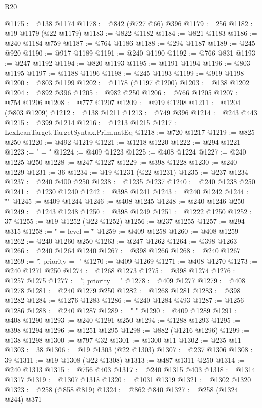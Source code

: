 \begin{lexlean}{R20}
\begin{coremodule}
@1175 := @138 @1174
@1178 := @842 (@727 @66) @396
@1179 := 256
@1182 := @19 @1179 (@22 @1179)
@1183 := @822 @1182
@1184 := @821 @1183
@1186 := @240 @1184 @759
@1187 := @764 @1186
@1188 := @294 @1187
@1189 := @245 @920
@1190 := @917 @1189
@1191 := @240 @1190
@1192 := @766 @831
@1193 := @247 @1192
@1194 := @820 @1193
@1195 := @1191 @1194
@1196 := @803 @1195
@1197 := @1188 @1196
@1198 := @245 @1193
@1199 := @919 @1198
@1200 := @803 @1199
@1202 := @1178 (@1197 @1200)
@1203 := @138 @1202
@1204 := @892 @396
@1205 := @982 @250
@1206 := @766 @1205
@1207 := @754 @1206
@1208 := @777 @1207
@1209 := @919 @1208
@1211 := @1204 (@803 @1209)
@1212 := @138 @1211
@1213 := @749 @396
@1214 := @243 @443
@1215 := @399 @1214
@1216 := @1213 @1215
@1217 := LexLeanTarget.TargetSyntax.Prim.natEq
@1218 := @720 @1217
@1219 := @825 @250
@1220 := @492 @1219
@1221 := @1218 @1220
@1222 := @294 @1221
@1223 := " = \""
@1224 := @409 @1223
@1225 := @408 @1224
@1227 := @240 @1225 @250
@1228 := @247 @1227
@1229 := @398 @1228
@1230 := @240 @1229
@1231 := 36
@1234 := @19 @1231 (@22 @1231)
@1235 := @237 @1234
@1237 := @240 @400 @250
@1238 := @1235 @1237
@1240 := @240 @1238 @250
@1241 := @1230 @1240
@1242 := @398 @1241
@1243 := @240 @1242
@1244 := "\"\n"
@1245 := @409 @1244
@1246 := @408 @1245
@1248 := @240 @1246 @250
@1249 := @1243 @1248
@1250 := @398 @1249
@1251 := @1222 @1250
@1252 := 37
@1255 := @19 @1252 (@22 @1252)
@1256 := @237 @1255
@1257 := @294 @315
@1258 := " = { level = \""
@1259 := @409 @1258
@1260 := @408 @1259
@1262 := @240 @1260 @250
@1263 := @247 @1262
@1264 := @398 @1263
@1266 := @240 @1264 @1240
@1267 := @398 @1266
@1268 := @240 @1267
@1269 := "\", priority = -"
@1270 := @409 @1269
@1271 := @408 @1270
@1273 := @240 @1271 @250
@1274 := @1268 @1273
@1275 := @398 @1274
@1276 := @1257 @1275
@1277 := "\", priority = "
@1278 := @409 @1277
@1279 := @408 @1278
@1281 := @240 @1279 @250
@1282 := @1268 @1281
@1283 := @398 @1282
@1284 := @1276 @1283
@1286 := @240 @1284 @493
@1287 := @1256 @1286
@1288 := @240 @1287
@1289 := " }\n"
@1290 := @409 @1289
@1291 := @408 @1290
@1293 := @240 @1291 @250
@1294 := @1288 @1293
@1295 := @398 @1294
@1296 := @1251 @1295
@1298 := @882 (@1216 @1296)
@1299 := @138 @1298
@1300 := @797 @32
@1301 := @1300 @11
@1302 := @235 @11
@1303 := 38
@1306 := @19 @1303 (@22 @1303)
@1307 := @237 @1306
@1308 := 39
@1311 := @19 @1308 (@22 @1308)
@1313 := @487 @1311 @250
@1314 := @240 @1313
@1315 := @756 @403
@1317 := @240 @1315 @403
@1318 := @1314 @1317
@1319 := @1307 @1318
@1320 := @1031 @1319
@1321 := @1302 @1320
@1323 := @258 (@858 @819)
@1324 := @862 @840
@1327 := @258 (@1324 @244) @371

\end{coremodule}
\end{lexlean}
